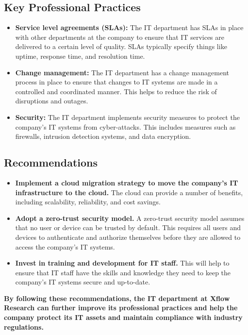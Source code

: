 \documentclass{article}
\begin{document}
\subsection{Key Professional Practices}

\begin{itemize}
  \item \textbf{Service level agreements (SLAs):} The IT department has SLAs in place with other departments at the company to ensure that IT services are delivered to a certain level of quality. SLAs typically specify things like uptime, response time, and resolution time.
  \item \textbf{Change management:} The IT department has a change management process in place to ensure that changes to IT systems are made in a controlled and coordinated manner. This helps to reduce the risk of disruptions and outages.
  \item \textbf{Security:} The IT department implements security measures to protect the company's IT systems from cyber-attacks. This includes measures such as firewalls, intrusion detection systems, and data encryption.
\end{itemize}

\subsection{Recommendations}

\begin{itemize}
  \item \textbf{Implement a cloud migration strategy to move the company's IT infrastructure to the cloud.} The cloud can provide a number of benefits, including scalability, reliability, and cost savings.
  \item \textbf{Adopt a zero-trust security model.} A zero-trust security model assumes that no user or device can be trusted by default. This requires all users and devices to authenticate and authorize themselves before they are allowed to access the company's IT systems.
  \item \textbf{Invest in training and development for IT staff.} This will help to ensure that IT staff have the skills and knowledge they need to keep the company's IT systems secure and up-to-date.
\end{itemize}

\textbf{By following these recommendations, the IT department at Xflow Research can further improve its professional practices and help the company protect its IT assets and maintain compliance with industry regulations.}

\end{document}
